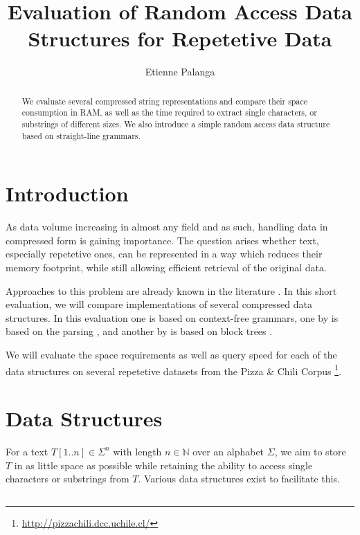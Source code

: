 \documentclass{scrartcl}
\title{Evaluation of Random Access Data Structures for Repetetive Data}
\author{Etienne Palanga}
\begin{document}
\maketitle

\begin{abstract}
	We evaluate several compressed string representations and compare their space consumption in RAM,
	as well as the time required to extract single characters, or substrings of different sizes.
	We also introduce a simple random access data structure based on straight-line grammars.
\end{abstract}

\section{Introduction}

As data volume increasing in almost any field and as such, handling data in compressed form is gaining importance.
The question arises whether text, especially repetetive ones, can be represented in a way which reduces their memory footprint, while still allowing efficient retrieval of the original data.

Approaches to this problem are already known in the literature \cite{belazzougui_block_2021,bille_random_2013,kreft_self-index_2011,nunes_grammar_2022}.
In this short evaluation, we will compare implementations of several compressed data structures.
In this evaluation one is based on context-free grammars, one by \citeauthor{kreft_self-index_2011} is based on the \lzend{} parsing \cite{kreft_self-index_2011}, and another by \citeauthor{belazzougui_block_2021} is based on block trees \cite{belazzougui_block_2021}.

We will evaluate the space requirements as well as query speed for each of the data structures on several repetetive datasets from the Pizza \& Chili Corpus \footnote{\url{http://pizzachili.dcc.uchile.cl/}}.

\section{Data Structures}

For a text $T[1..n] \in \Sigma^n$ with length $n \in \mathbb{N}$ over an alphabet $\Sigma$, we aim to store $T$ in as little space as possible while retaining the ability to access single characters or substrings from $T$.
Various data structures exist to facilitate this.

\subsection{\lzend{}}
\end{document}
